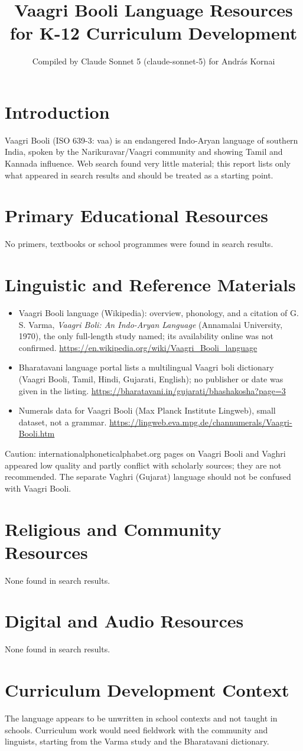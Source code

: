 \documentclass[12pt]{article}
\title{Vaagri Booli Language Resources for K-12 Curriculum Development}
\author{Compiled by Claude Sonnet 5 (claude-sonnet-5) for Andr\'as Kornai}
\date{}
\begin{document}
\maketitle
\section{Introduction}
Vaagri Booli (ISO 639-3: vaa) is an endangered Indo-Aryan language of southern India, spoken by the Narikuravar/Vaagri community and showing Tamil and Kannada influence. Web search found very little material; this report lists only what appeared in search results and should be treated as a starting point.
\section{Primary Educational Resources}
No primers, textbooks or school programmes were found in search results.
\section{Linguistic and Reference Materials}
\begin{itemize}
\item Vaagri Booli language (Wikipedia): overview, phonology, and a citation of G. S. Varma, \emph{Vaagri Boli: An Indo-Aryan Language} (Annamalai University, 1970), the only full-length study named; its availability online was not confirmed. \url{https://en.wikipedia.org/wiki/Vaagri_Booli_language}
\item Bharatavani language portal lists a multilingual Vaagri boli dictionary (Vaagri Booli, Tamil, Hindi, Gujarati, English); no publisher or date was given in the listing. \url{https://bharatavani.in/gujarati/bhashakosha?page=3}
\item Numerals data for Vaagri Booli (Max Planck Institute Lingweb), small dataset, not a grammar. \url{https://lingweb.eva.mpg.de/channumerals/Vaagri-Booli.htm}
\end{itemize}
Caution: internationalphoneticalphabet.org pages on Vaagri Booli and Vaghri appeared low quality and partly conflict with scholarly sources; they are not recommended. The separate Vaghri (Gujarat) language should not be confused with Vaagri Booli.
\section{Religious and Community Resources}
None found in search results.
\section{Digital and Audio Resources}
None found in search results.
\section{Curriculum Development Context}
The language appears to be unwritten in school contexts and not taught in schools. Curriculum work would need fieldwork with the community and linguists, starting from the Varma study and the Bharatavani dictionary.
\end{document}
